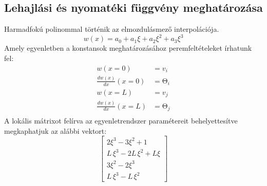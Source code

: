 \documentclass{article}
\begin{document}
	\subsection{Lehajlási és nyomatéki függvény meghatározása}
		Harmadfokú polinommal történik az elmozdulásmező interpolációja.
		\begin{equation}
			w(x)=a_0+a_1\xi+a_2\xi^2+a_3\xi^3
		\end{equation}
		Amely egyenletben a konstansok meghatározásához peremfeltételeket írhatunk fel:
	    \begin{align*}
	    	w(x=0)&=v_i\\
	    	\frac{dw(x)}{dx}(x=0)&=\mathrm{\Theta}_i\\
	    	w(x=L)&=v_j\\
	    	\frac{dw(x)}{dx}(x=L)&=\mathrm{\Theta}_j\\	
	    \end{align*}
		A lokális mátrixot felírva az egyenletrendszer paramétereit behelyettesítve megkaphatjuk az alábbi vektort:
		\begin{equation}
			\begin{bmatrix}2 {{\xi}^{3}}-3 {{\xi}^{2}}+1\\
			L\, {{\xi}^{3}}-2 L\, {{\xi}^{2}}+L \xi\\
			3 {{\xi}^{2}}-2 {{\xi}^{3}}\\
			L\, {{\xi}^{3}}-L\, {{\xi}^{2}}\end{bmatrix}
		\end{equation}
		
\end{document}
